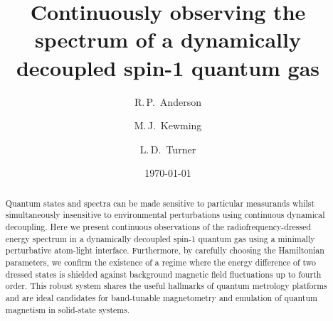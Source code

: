 \documentclass[aps,prl,reprint,superscriptaddress,floatfix]{revtex4-1}
\begin{document}
\title{Continuously observing the spectrum of a dynamically decoupled spin-1 quantum gas}

\author{R.\,P.~Anderson}
\author{M.\,J.~Kewming}
\author{L.\,D.~Turner}

\date{\today}

\begin{abstract}
Quantum states and spectra can be made sensitive to particular measurands whilst simultaneously insensitive to environmental perturbations using continuous dynamical decoupling.
Here we present continuous observations of the radiofrequency-dressed energy spectrum in a dynamically decoupled spin-1 quantum gas using a minimally perturbative atom-light interface. 
Furthermore, by carefully choosing the Hamiltonian parameters, we confirm the existence of a regime where the energy difference of two dressed states is shielded against background magnetic field fluctuations up to fourth order.
This robust system shares the useful hallmarks of quantum metrology platforms and are ideal candidates for band-tunable magnetometry and emulation of quantum magnetism in solid-state systems.
\end{abstract}
%

\maketitle
\end{document}
